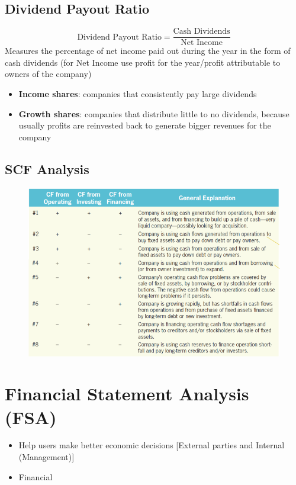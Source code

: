 \documentclass{article}
\begin{document}
\begin{multicols}{2}
\subsection{Dividend Payout Ratio}
$$\text{Dividend Payout Ratio} = \frac{\text{Cash Dividends}}{\text{Net Income}}$$
Measures the percentage of net income paid out during the year in the form of cash dividends (for Net Income use profit for the year/profit attributable to owners of the company)
\begin{itemize}
	\item \textbf{Income shares}: companies that consistently pay large dividends
	\item \textbf{Growth shares}: companies that distribute little to no dividends, because usually profits are reinvested back to generate bigger revenues for the company
\end{itemize}

\subsection{SCF Analysis}
\begin{figure}[H]
	\centering
	\includegraphics[width=\columnwidth]{image/scf_analysis.png}
\end{figure}

\section{Financial Statement Analysis (FSA)}
\begin{itemize}
	\item Help users make better economic decisions [External parties and Internal (Management)]
	\item Financial
\end{itemize}


\end{multicols}
\end{document}
